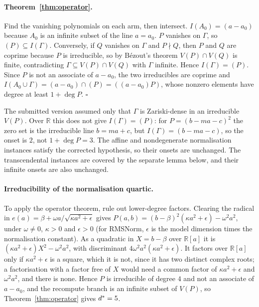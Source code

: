 \paragraph{Theorem~\ref{thm:operator}.} Find the vanishing polynomials on each arm, then intersect.
$I(A_0)=(a-a_0)$ because $A_0$ is an infinite subset of the line $a=a_0$.
$P$ vanishes on $\Gamma$, so $(P)\subseteq I(\Gamma)$. Conversely, if $Q$ vanishes on $\Gamma$ and $P\nmid Q$, then $P$
and $Q$ are coprime because $P$ is irreducible, so by B\'ezout's theorem $V(P)\cap V(Q)$ is finite, contradicting
$\Gamma\subseteq V(P)\cap V(Q)$ with $\Gamma$ infinite. Hence $I(\Gamma)=(P)$. Since $P$ is not an associate of
$a-a_0$, the two irreducibles are coprime and $I(A_0\cup\Gamma)=(a-a_0)\cap(P)=((a-a_0)P)$, whose nonzero elements
have degree at least $1+\deg P$. $\square$

The submitted version assumed only that $\Gamma$ is Zariski-dense in an irreducible $V(P)$. Over $\mathbb R$ this does
not give $I(\Gamma)=(P)$: for $P=(b-ma-c)^2$ the zero set is the irreducible line $b=ma+c$, but $I(\Gamma)=(b-ma-c)$,
so the onset is $2$, not $1+\deg P=3$. The affine and nondegenerate normalisation instances satisfy the corrected
hypothesis, so their onsets are unchanged. The transcendental instances are covered by the separate lemma below,
and their infinite onsets are also unchanged.

\paragraph{Irreducibility of the normalisation quartic.} To apply the operator theorem, rule out lower-degree
factors. Clearing the radical in
$e(a)=\beta+\omega a/\sqrt{\kappa a^2+\epsilon}$ gives $P(a,b)=(b-\beta)^2(\kappa a^2+\epsilon)-\omega^2a^2$, under
$\omega\neq0$, $\kappa>0$ and $\epsilon>0$ (for RMSNorm, $\epsilon$ is the model dimension times the normalisation
constant). As a quadratic in $X=b-\beta$ over $\mathbb R[a]$ it is $(\kappa a^2+\epsilon)X^2-\omega^2a^2$, with
discriminant $4\omega^2a^2(\kappa a^2+\epsilon)$. It factors over $\mathbb R[a]$ only if $\kappa a^2+\epsilon$ is a
square, which it is not, since it has two distinct complex roots; a factorisation with a factor free of $X$ would
need a common factor of $\kappa a^2+\epsilon$ and $\omega^2a^2$, and there is none. Hence $P$ is irreducible of degree
$4$ and not an associate of $a-a_0$, and the recompute branch is an infinite subset of $V(P)$, so
Theorem~\ref{thm:operator} gives $d^*=5$.

